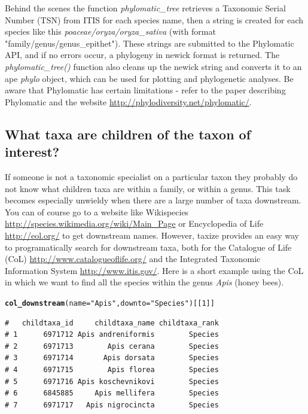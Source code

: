 \documentclass[10pt,a4paper,twocolumn]{article}\usepackage[]{graphicx}\usepackage[]{color}
\makeatletter
\newcommand{\hlnum}[1]{\textcolor[rgb]{0.686,0.059,0.569}{#1}}%
\newcommand{\hlstr}[1]{\textcolor[rgb]{0.192,0.494,0.8}{#1}}%
\newcommand{\hlstd}[1]{\textcolor[rgb]{0.345,0.345,0.345}{#1}}%
\newcommand{\hlkwc}[1]{\textcolor[rgb]{0.333,0.667,0.333}{#1}}%
\newcommand{\hlkwd}[1]{\textcolor[rgb]{0.737,0.353,0.396}{\textbf{#1}}}%
\newenvironment{kframe}{%
 \def\at@end@of@kframe{}%
 \ifinner\ifhmode%
  \def\at@end@of@kframe{\end{minipage}}%
  \begin{minipage}{\columnwidth}%
 \fi\fi%
 \def\FrameCommand##1{\hskip\@totalleftmargin \hskip-\fboxsep
 \colorbox{shadecolor}{##1}\hskip-\fboxsep
     \hskip-\linewidth \hskip-\@totalleftmargin \hskip\columnwidth}%
 \MakeFramed {\advance\hsize-\width
   \@totalleftmargin\z@ \linewidth\hsize
   \@setminipage}}%
 {\par\unskip\endMakeFramed%
 \at@end@of@kframe}
\newenvironment{knitrout}{}{} %
\makeatother
\begin{document}
Behind the scenes the function \emph{phylomatic\_tree} retrieves a Taxonomic Serial Number (TSN) from ITIS for each species name, then a string is created for each species like this \emph{poaceae/oryza/oryza\_sativa} (with format "family/genus/genus\_epithet"). These strings are submitted to the Phylomatic API, and if no errors occur, a phylogeny in newick format is returned. The \emph{phylomatic\_tree()} function also cleans up the newick string and converts it to an ape \emph{phylo} object, which can be used for plotting and phylogenetic analyses. Be aware that Phylomatic has certain limitations - refer to the paper describing Phylomatic \cite{webb2005} and the website \url{http://phylodiversity.net/phylomatic/}.


\subsection*{What taxa are children of the taxon of interest?}
If someone is not a taxonomic specialist on a particular taxon they probably do not know what children taxa are within a family, or within a genus. This task becomes especially unwieldy when there are a large number of taxa downstream. You can of course go to a website like Wikispecies \url{http://species.wikimedia.org/wiki/Main_Page} or Encyclopedia of Life \url{http://eol.org/} to get downstream names. However, taxize provides an easy way to programatically search for downstream taxa, both for the Catalogue of Life (CoL) \url{http://www.catalogueoflife.org/} and the Integrated Taxonomic Information System \url{http://www.itis.gov/}. Here is a short example using the CoL in which we want to find all the species within the genus \emph{Apis} (honey bees).

\begin{knitrout}\scriptsize
{}\color{fgcolor}\begin{kframe}
\begin{alltt}
\hlkwd{col_downstream}\hlstd{(}\hlkwc{name} \hlstd{=} \hlstr{"Apis"}\hlstd{,} \hlkwc{downto} \hlstd{=} \hlstr{"Species"}\hlstd{)[[}\hlnum{1}\hlstd{]]}
\end{alltt}
\begin{verbatim}
#   childtaxa_id     childtaxa_name childtaxa_rank
# 1      6971712 Apis andreniformis        Species
# 2      6971713        Apis cerana        Species
# 3      6971714       Apis dorsata        Species
# 4      6971715        Apis florea        Species
# 5      6971716 Apis koschevnikovi        Species
# 6      6845885     Apis mellifera        Species
# 7      6971717   Apis nigrocincta        Species
\end{verbatim}
\end{kframe}
\end{knitrout}
\end{document}
